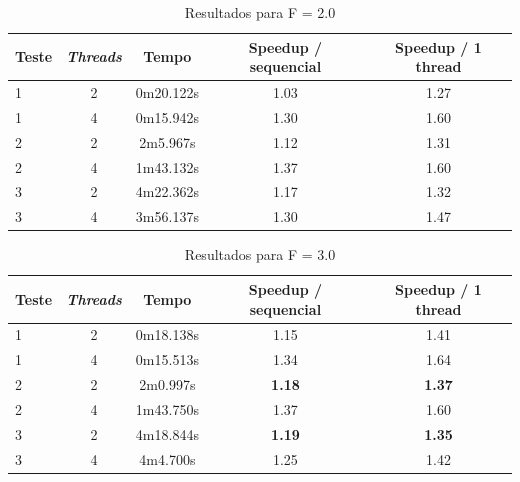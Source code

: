 \documentclass[12pt]{article}
\begin{document}
\begin{table}[H]
  \begin{center}
    \begin{tabular}{ | l | c | c | c | c |}
      \hline
      \textbf{Teste} & \textbf{\textit{Threads}} & \textbf{Tempo} & \textbf{Speedup / sequencial} & \textbf{Speedup / 1 thread}\\ \hline
      1 & 2 & 0m20.122s & 1.03 & 1.27 \\ \hline
      1 & 4 & 0m15.942s & 1.30 & 1.60 \\ \hline
      2 & 2 & 2m5.967s & 1.12 & 1.31 \\ \hline
      2 & 4 & 1m43.132s & 1.37 & 1.60 \\ \hline
      3 & 2 & 4m22.362s & 1.17 & 1.32 \\ \hline
      3 & 4 & 3m56.137s & 1.30 & 1.47 \\ \hline
  \end{tabular}
  \caption{Resultados para F = 2.0}
  \label{tbl:resultados2}
  \end{center}
\end{table}

\begin{table}[H]
  \begin{center}
    \begin{tabular}{ | l | c | c | c | c |}
      \hline
      \textbf{Teste} & \textbf{\textit{Threads}} & \textbf{Tempo} & \textbf{Speedup / sequencial} & \textbf{Speedup / 1 thread}\\ \hline
      1 & 2 & 0m18.138s & 1.15 & 1.41 \\ \hline
      1 & 4 & 0m15.513s & 1.34 & 1.64 \\ \hline
      2 & 2 & 2m0.997s & \textbf{1.18} & \textbf{1.37} \\ \hline
      2 & 4 & 1m43.750s & 1.37 & 1.60 \\ \hline
      3 & 2 & 4m18.844s & \textbf{1.19} & \textbf{1.35} \\ \hline
      3 & 4 & 4m4.700s & 1.25 & 1.42 \\ \hline
  \end{tabular}
  \caption{Resultados para F = 3.0}
  \label{tbl:resultados3}
  \end{center}
\end{table}
\end{document}
